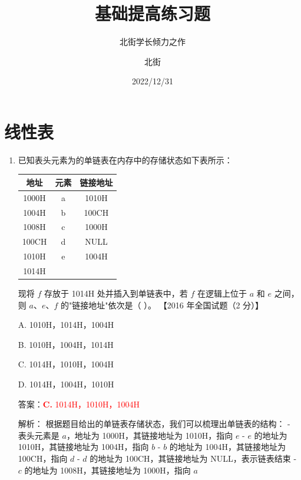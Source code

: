 \documentclass[lang=cn,newtx,10pt,scheme=chinese]{../../../elegantbook}
\title{基础提高练习题}
\subtitle{北街学长倾力之作}
\author{北街}
\date{2022/12/31}
\begin{document}
\maketitle
\frontmatter

\tableofcontents

\mainmatter



\chapter{线性表}
\begin{enumerate}
    \item 已知表头元素为的单链表在内存中的存储状态如下表所示：
        \begin{table}[h!]
            \centering
            \begin{tabular}{|c|c|c|}
                \hline
                地址 & 元素 & 链接地址 \\ \hline
                1000H & a & 1010H \\ \hline
                1004H & b & 100CH \\ \hline
                1008H & c & 1000H \\ \hline
                100CH & d & NULL \\ \hline
                1010H & e & 1004H \\ \hline
                1014H &   &  \\ \hline
            \end{tabular}
        \end{table}
    
        现将 $f$ 存放于 1014H 处并插入到单链表中，若 $f$ 在逻辑上位于 $a$ 和 $e$ 之间，则 $a$、$e$、$f$ 的"链接地址"依次是（ ）。  
        【2016 年全国试题（2 分）】 
    
        A. 1010H，1014H，1004H  
    
        B. 1010H，1004H，1014H 
    
        C. 1014H，1010H，1004H  
    
        D. 1014H，1004H，1010H  
    
        答案：\textcolor{red}{\textbf{C.} 1014H，1010H，1004H}

        解析：
        根据题目给出的单链表存储状态，我们可以梳理出单链表的结构：
        - 表头元素是 $a$，地址为 1000H，其链接地址为 1010H，指向 $e$
        - $e$ 的地址为 1010H，其链接地址为 1004H，指向 $b$
        - $b$ 的地址为 1004H，其链接地址为 100CH，指向 $d$
        - $d$ 的地址为 100CH，其链接地址为 NULL，表示链表结束
        - $c$ 的地址为 1008H，其链接地址为 1000H，指向 $a$
        

\end{enumerate}
\end{document}
